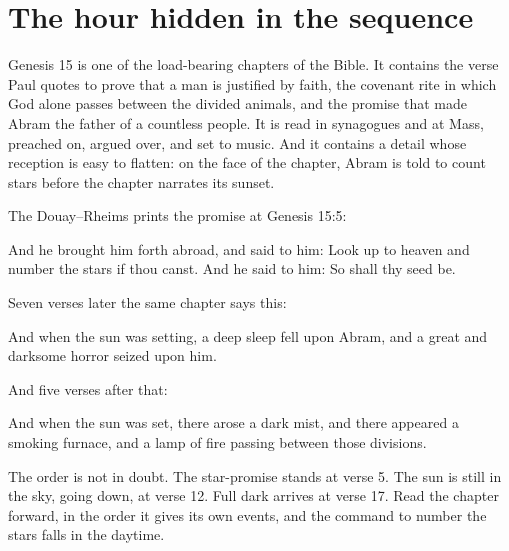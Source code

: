 \section{The hour hidden in the sequence}

Genesis 15 is one of the load-bearing chapters of the Bible. It contains the
verse Paul quotes to prove that a man is justified by faith, the covenant rite
in which God alone passes between the divided animals, and the promise that
made Abram the father of a countless people. It is read in synagogues and at
Mass, preached on, argued over, and set to music. And it contains a detail whose
reception is easy to flatten: on the face of the chapter, Abram is told to count
stars before the chapter narrates its sunset.

The Douay--Rheims prints the promise at Genesis 15:5:

\begin{studyframe}
And he brought him forth abroad, and said to him: Look up to heaven and number
the stars if thou canst. And he said to him: So shall thy seed be.
\end{studyframe}

\noindent Seven verses later the same chapter says this:

\begin{studyframe}
And when the sun was setting, a deep sleep fell upon Abram, and a great and
darksome horror seized upon him.
\end{studyframe}

\noindent And five verses after that:

\begin{studyframe}
And when the sun was set, there arose a dark mist, and there appeared a smoking
furnace, and a lamp of fire passing between those divisions.
\end{studyframe}

The order is not in doubt. The star-promise stands at verse 5. The sun is still
in the sky, going down, at verse 12. Full dark arrives at verse 17. Read the
chapter forward, in the order it gives its own events, and the command to number
the stars falls in the daytime.

